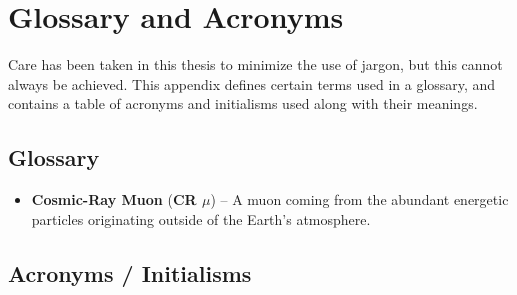 \chapter{Glossary and Acronyms}
\label{app_glossary}

Care has been taken in this thesis to minimize the use of jargon, but this cannot always be achieved.  This appendix defines certain terms used in a glossary, and contains a table of acronyms and initialisms used along with their meanings.

\section{Glossary}
\label{sec_glossary}

\begin{itemize}

\item
    \textbf{Cosmic-Ray Muon} 
        (\textbf{CR $\mu$}) -- A muon coming from the abundant energetic particles originating outside of the Earth's atmosphere.

\end{itemize}


\section{Acronyms / Initialisms}
\label{sec:acronym}


